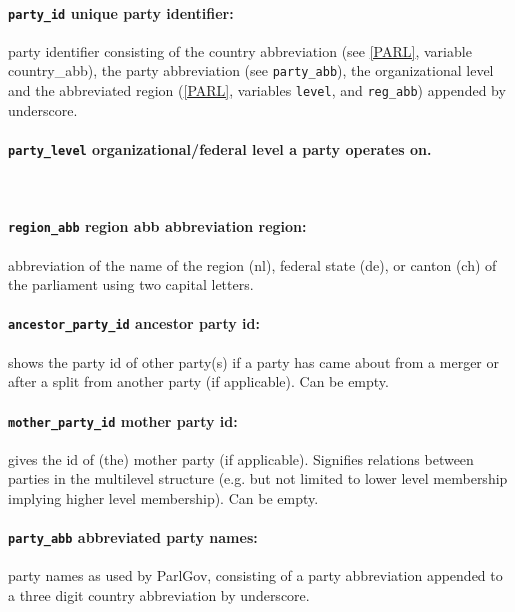 \documentclass{article}
\begin{document}
\paragraph{\texttt{party\_id} unique party identifier:} party identifier consisting of the country abbreviation (see \ref{PARL}, variable country\_abb), the party abbreviation (see \texttt{party\_abb}), the organizational level and the abbreviated region (\ref{PARL}, variables \texttt{level}, and \texttt{reg\_abb}) appended by underscore.\\

\paragraph{\texttt{party\_level} organizational/federal level a party operates on.}\\

\paragraph{\texttt{region\_abb} region abb abbreviation region:}  abbreviation of the name of the region (\gls{nl}), federal state (\gls{de}), or canton (\gls{ch}) of the parliament using two capital letters.\\

\paragraph{\texttt{ancestor\_party\_id} ancestor party id:} shows the party id of other party(s) if a party has came about from a merger or after a split from another party (if applicable). Can be empty.\\

\paragraph{\texttt{mother\_party\_id} mother party id:} gives the id of (the) mother party (if applicable). Signifies relations between parties in the multilevel structure (e.g. but not limited to lower level membership implying higher level membership). Can be empty.\\

\paragraph{\texttt{party\_abb} abbreviated party names:} party names as used by ParlGov, consisting of a party abbreviation appended to a three digit country abbreviation by underscore.\\
\end{document}
